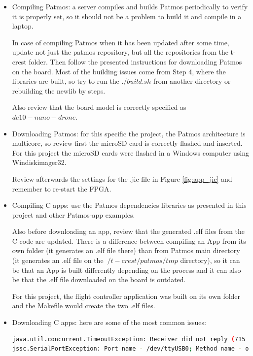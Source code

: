 \begin{itemize}
    \item Compiling Patmos: a server compiles and builds Patmos periodically to verify it is properly set, so it should not be a problem to build it and compile in a laptop.
    
    In case of compiling Patmos when it has been updated after some time, update not just the patmos repository, but all the repositories from the t-crest folder. Then follow the presented instructions for downloading Patmos on the board. Most of the building issues come from Step 4, where the libraries are built, so try to run the $./build.sh$ from another directory or rebuilding the newlib by steps.
    
    Also review that the board model is correctly specified as $de10-nano-drone$.
    
    \item Downloading Patmos: for this specific the project, the Patmos architecture is multicore, so review first the microSD card is correctly flashed and inserted. For this project the microSD cards were flashed in a Windows computer using Windiskimager32.
    
    Review afterwards the settings for the .jic file in Figure \ref{fig:app_jic} and remember to re-start the FPGA.
    
    \item Compiling C apps: use the Patmos dependencies libraries as presented in this project and other Patmos-app examples. 
    
    Also before downloading an app, review that the generated .elf files from the C code are updated. There is a difference between compiling an App from its own folder (it generates an .elf file there) than from Patmos main directory (it generates an .elf file on the $~/t-crest/patmos/tmp$ directory), so it can be that an App is built differently depending on the process and it can also be that the .elf file downloaded on the board is outdated. 
    
    For this project, the flight controller application was built on its own folder and the Makefile would create the two .elf files.
    
    
    \item Downloading C apps: here are some of the most common issues:
\lstset{style=Bstyle}
\begin{lstlisting}[language=bash]
java.util.concurrent.TimeoutException: Receiver did not reply (715 responses missing)
jssc.SerialPortException: Port name - /dev/ttyUSB0; Method name - openPort(); Exception type - Permission denied.
\end{lstlisting} 


\end{itemize}
